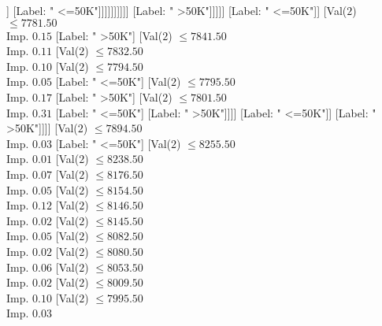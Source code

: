 \documentclass[margin=10pt]{standalone}
\begin{document}
\begin{forest}
																																			[Val($2$) $ \leq 7706.50$ \\ Imp. $0.20$
																																				[Label: " <=50K"]
																																				[Label: " >50K"]]
																																			[Label: " <=50K"]]]]]]]]]]
																										[Label: " >50K"]]]]]
																						[Label: " <=50K"]]
																					[Val($2$) $ \leq 7781.50$ \\ Imp. $0.15$
																						[Label: " >50K"]
																						[Val($2$) $ \leq 7841.50$ \\ Imp. $0.11$
																							[Val($2$) $ \leq 7832.50$ \\ Imp. $0.10$
																								[Val($2$) $ \leq 7794.50$ \\ Imp. $0.05$
																									[Label: " <=50K"]
																									[Val($2$) $ \leq 7795.50$ \\ Imp. $0.17$
																										[Label: " >50K"]
																										[Val($2$) $ \leq 7801.50$ \\ Imp. $0.31$
																											[Label: " <=50K"]
																											[Label: " >50K"]]]]
																								[Label: " <=50K"]]
																							[Label: " >50K"]]]]
																				[Val($2$) $ \leq 7894.50$ \\ Imp. $0.03$
																					[Label: " <=50K"]
																					[Val($2$) $ \leq 8255.50$ \\ Imp. $0.01$
																						[Val($2$) $ \leq 8238.50$ \\ Imp. $0.07$
																							[Val($2$) $ \leq 8176.50$ \\ Imp. $0.05$
																								[Val($2$) $ \leq 8154.50$ \\ Imp. $0.12$
																									[Val($2$) $ \leq 8146.50$ \\ Imp. $0.02$
																										[Val($2$) $ \leq 8145.50$ \\ Imp. $0.05$
																											[Val($2$) $ \leq 8082.50$ \\ Imp. $0.02$
																												[Val($2$) $ \leq 8080.50$ \\ Imp. $0.06$
																													[Val($2$) $ \leq 8053.50$ \\ Imp. $0.02$
																														[Val($2$) $ \leq 8009.50$ \\ Imp. $0.10$
																															[Val($2$) $ \leq 7995.50$ \\ Imp. $0.03$

\end{forest}
\end{document}
